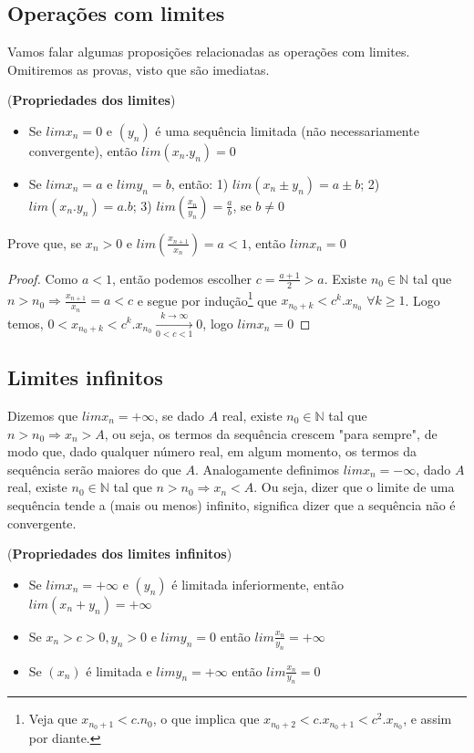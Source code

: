 \subsection{Operações com limites}
Vamos falar algumas proposições relacionadas as operações com limites. Omitiremos as provas, visto que são imediatas.

\begin{theorem}(\textbf{Propriedades dos limites})
\begin{itemize}
    \item Se $limx_{n}=0$ e $(y_{n})$ é uma sequência limitada (não necessariamente convergente), então $lim(x_{n}.y_{n})=0$
    \item Se $limx_{n}=a$ e $limy_{n}=b$, então: 1) $lim(x_{n}\pm y_{n})=a\pm b$; 2)$lim(x_{n}.y_{n})=a.b$; 3) $lim(\frac{x_{n}}{y_{n}})=\frac{a}{b}$, se $b \neq 0$
\end{itemize}
\end{theorem}


\begin{prob}
Prove que, se $x_{n}>0$ e $lim(\frac{x_{n+1}}{x_{n}})=a<1$, então $limx_{n}=0$
\end{prob}
\begin{proof}
Como $a<1$, então podemos escolher $c=\frac{a+1}{2}>a$. Existe $n_{0} \in \mathbb{N}$ tal que $n>n_{0}\Rightarrow \frac{x_{n+1}}{x_{n}}=a<c$ e segue por indução\footnote{Veja que $x_{n_{0}+1}<c.n_{0}$, o que implica que $x_{n_{0}+2}<c.x_{n_{0}+1}<c^{2}.x_{n_{0}}$, e assim por diante.} que $x_{n_{0}+k}<c^{k}.x_{n_{0}}$ $\forall k \geq 1$. Logo temos, $0<x_{n_{0}+k}<c^{k}.x_{n_{0}}\xrightarrow[0<c<1]{k\rightarrow \infty }0$, logo $limx_{n}=0$
\end{proof}
\newpage

\subsection{Limites infinitos}
Dizemos que $limx_{n}=+\infty$, se dado $A$ real, existe $n_{0} \in \mathbb{N}$ tal que $n>n_{0}\Rightarrow x_{n}>A$, ou seja, os termos da sequência crescem "para sempre", de modo que, dado qualquer número real, em algum momento, os termos da sequência serão maiores do que $A$. Analogamente definimos $limx_{n}=-\infty$,  dado $A$ real, existe $n_{0} \in \mathbb{N}$ tal que $n>n_{0}\Rightarrow x_{n}<A$. Ou seja, dizer que o limite de uma sequência tende a (mais ou menos) infinito, significa dizer que a sequência não é convergente.

\begin{theorem}(\textbf{Propriedades dos limites infinitos})
\begin{itemize}
    \item Se $limx_{n}=+\infty$ e $(y_{n})$ é limitada inferiormente, então $lim(x_{n}+y_{n})=+\infty$
    \item Se $x_{n}>c>0,y_{n}>0$ e $limy_{n}=0$ então $lim\frac{x_{n}}{y_{n}}=+\infty$
    \item Se $(x_{n})$ é limitada e $limy_{n}=+\infty$ então $lim\frac{x_{n}}{y_{n}}=0$
\end{itemize}
\end{theorem}

